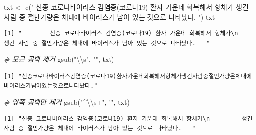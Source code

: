 \documentclass[
  11pt,
]{krantz}
\newenvironment{Shaded}{\begin{snugshade}}{\end{snugshade}}
\newcommand{\CommentTok}[1]{\textcolor[rgb]{0.37,0.37,0.37}{\textit{#1}}}
\newcommand{\FunctionTok}[1]{\textcolor[rgb]{0,0,0}{#1}}
\newcommand{\NormalTok}[1]{#1}
\newcommand{\OtherTok}[1]{\textcolor[rgb]{0.37,0.37,0.37}{#1}}
\newcommand{\SpecialCharTok}[1]{\textcolor[rgb]{0,0,0}{#1}}
\newcommand{\StringTok}[1]{\textcolor[rgb]{0.5,0.5,0.5}{#1}}
\begin{document}
\footnotesize

\begin{Shaded}
\begin{Highlighting}[]
\NormalTok{txt }\OtherTok{\textless{}{-}} \FunctionTok{c}\NormalTok{(}\StringTok{"        신종 코로나바이러스 감염증(코로나19) 환자 가운데 회복해서 항체가}
\StringTok{         생긴 사람 중 절반가량은 체내에 바이러스가 남아 있는 것으로 나타났다.   "}\NormalTok{)}
\NormalTok{txt}
\end{Highlighting}
\end{Shaded}

\begin{verbatim}
[1] "        신종 코로나바이러스 감염증(코로나19) 환자 가운데 회복해서 항체가\n         생긴 사람 중 절반가량은 체내에 바이러스가 남아 있는 것으로 나타났다.   "
\end{verbatim}

\begin{Shaded}
\begin{Highlighting}[]
\CommentTok{\# 모근 공백 제거}
\FunctionTok{gsub}\NormalTok{(}\StringTok{"}\SpecialCharTok{\textbackslash{}\textbackslash{}}\StringTok{s"}\NormalTok{, }\StringTok{""}\NormalTok{, txt)}
\end{Highlighting}
\end{Shaded}

\begin{verbatim}
[1] "신종코로나바이러스감염증(코로나19)환자가운데회복해서항체가생긴사람중절반가량은체내에바이러스가남아있는것으로나타났다."
\end{verbatim}

\begin{Shaded}
\begin{Highlighting}[]
\CommentTok{\# 앞쪽 공백만 제거}
\FunctionTok{gsub}\NormalTok{(}\StringTok{"\^{}}\SpecialCharTok{\textbackslash{}\textbackslash{}}\StringTok{s+"}\NormalTok{, }\StringTok{""}\NormalTok{, txt)}
\end{Highlighting}
\end{Shaded}

\begin{verbatim}
[1] "신종 코로나바이러스 감염증(코로나19) 환자 가운데 회복해서 항체가\n         생긴 사람 중 절반가량은 체내에 바이러스가 남아 있는 것으로 나타났다.   "
\end{verbatim}

\begin{Shaded}
\end{Shaded}
\end{document}
